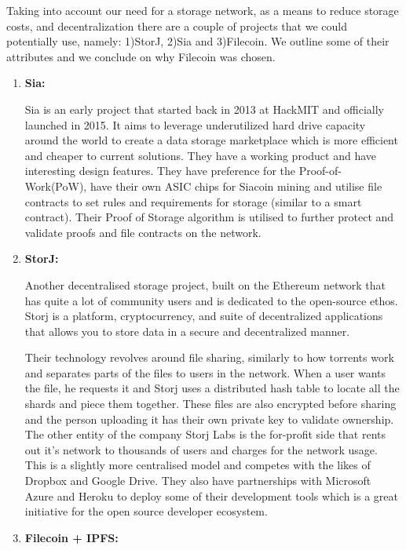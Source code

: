 Taking into account our need for a storage network, as a means to reduce storage costs, and decentralization there are a couple of projects that we could potentially use, namely: 1)StorJ\cite{storj}, 2)Sia\cite{sia} and 3)Filecoin\cite{filecoinlabs}. We outline some of their attributes and we conclude on why Filecoin was chosen.

\begin{enumerate}
    \item \textbf{Sia:}
    
Sia is an early project that started back in 2013 at HackMIT and officially launched in 2015. It aims to leverage underutilized hard drive capacity around the world to create a data storage marketplace which is more efficient and cheaper to current solutions. They have a working product and have interesting design features. They have preference for the Proof-of-Work(PoW), have their own ASIC chips for Siacoin mining and utilise file contracts to set rules and requirements for storage (similar to a smart contract). Their Proof of Storage algorithm is utilised to further protect and validate proofs and file contracts on the network.

\item \textbf{StorJ:}

Another decentralised storage project, built on the Ethereum network that has quite a lot of community users and is dedicated to the open-source ethos. Storj is a platform, cryptocurrency, and suite of decentralized applications that allows you to store data in a secure and decentralized manner.

Their technology revolves around file sharing, similarly to how torrents work and separates parts of the files to users in the network. When a user wants the file, he requests it and Storj uses a distributed hash table to locate all the shards and piece them together. These files are also encrypted before sharing and the person uploading it has their own private key to validate ownership. The other entity of the company Storj Labs is the for-profit side that rents out it’s network to thousands of users and charges for the network usage. This is a slightly more centralised model and competes with the likes of Dropbox and Google Drive. They also have partnerships with Microsoft Azure and Heroku to deploy some of their development tools which is a great initiative for the open source developer ecosystem.

\item \textbf{Filecoin + IPFS:}


\end{enumerate}
